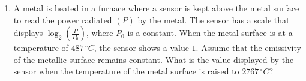 
\begin{enumerate}
    \item A metal is heated in a furnace where a sensor is kept above the metal surface to read the power radiated $(P)$ by the metal. The sensor has a scale that displays $\log_2\left(\frac{P}{P_0}\right)$, where $P_0$ is a constant. When the metal surface is at a temperature of $487\, ^\circ C$, the sensor shows a value $1$. Assume that the emissivity of the metallic surface remains constant. What is the value displayed by the sensor when the temperature of the metal surface is raised to $2767\, ^\circ C$?
    \underline{\hspace{2.5 cm}}
\end{enumerate}

